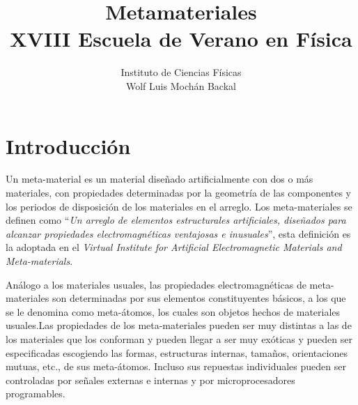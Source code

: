 \documentclass[12pt]{article}
\title{Metamateriales \\
  XVIII Escuela de Verano en Física}
\author{ Instituto de Ciencias Físicas \\
      \small Wolf Luis Mochán Backal }
\date{}
\begin{document}
\maketitle 
\tableofcontents

\section{Introducción}


Un meta-material es un material diseñado artificialmente con dos o más
materiales, con propiedades determinadas por la geometría de las
componentes y los periodos de disposición de los materiales en el
arreglo. Los meta-materiales se definen como ``{\em Un arreglo de
  elementos estructurales artificiales, diseñados para alcanzar
  propiedades electromagnéticas ventajosas e
  inusuales}''\cite{Metamorphose}, esta definición es la adoptada en
el {\em Virtual Institute for Artificial Electromagnetic Materials and
  Meta-materials}.

Análogo a los materiales usuales, las propiedades electromagnéticas de
meta-materiales son determinadas por sus elementos constituyentes
básicos, a los que se le denomina como meta-átomos, los cuales son
objetos hechos de materiales usuales.Las propiedades de los
meta-materiales pueden ser muy distintas a las de los materiales que
los conforman y pueden llegar a ser muy exóticas y pueden ser
especificadas escogiendo las formas, estructuras internas, tamaños,
orientaciones mutuas, etc., de sus meta-átomos.  Incluso sus repuestas
individuales pueden ser controladas por señales externas e internas y
por microprocesadores
programables.\cite{IntroductiontoMetamaterialsandNanophotonics}
\end{document}
